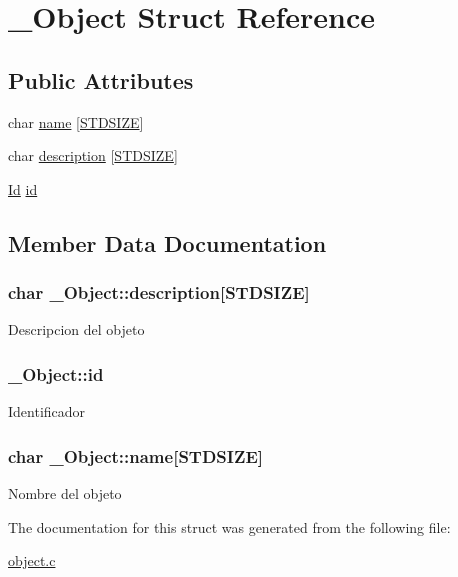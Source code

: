 \hypertarget{struct__Object}{\section{\+\_\+\+Object Struct Reference}
\label{struct__Object}
}
\subsection*{Public Attributes}
\begin{DoxyCompactItemize}
\item 
char \hyperlink{struct__Object_a5f13167436f75d12f48d3f152ce91d0a}{name} \mbox{[}\hyperlink{types_8h_a431b1676533a0e1714aff7d6a5542406}{S\+T\+D\+S\+I\+Z\+E}\mbox{]}
\item 
char \hyperlink{struct__Object_a4797c28bbea5a64792ec85433ee7215e}{description} \mbox{[}\hyperlink{types_8h_a431b1676533a0e1714aff7d6a5542406}{S\+T\+D\+S\+I\+Z\+E}\mbox{]}
\item 
\hyperlink{types_8h_a845e604fb28f7e3d97549da3448149d3}{Id} \hyperlink{struct__Object_a3cff7a0e8dc4e9d23895ed9af1b7653a}{id}
\end{DoxyCompactItemize}


\subsection{Member Data Documentation}
\hypertarget{struct__Object_a4797c28bbea5a64792ec85433ee7215e}{
\subsubsection[{description}]{\setlength{\rightskip}{0pt plus 5cm}char \+\_\+\+Object\+::description\mbox{[}{\bf S\+T\+D\+S\+I\+Z\+E}\mbox{]}}}\label{struct__Object_a4797c28bbea5a64792ec85433ee7215e}
Descripcion del objeto \hypertarget{struct__Object_a3cff7a0e8dc4e9d23895ed9af1b7653a}{
\subsubsection[{id}]{ \+\_\+\+Object\+::id}}\label{struct__Object_a3cff7a0e8dc4e9d23895ed9af1b7653a}
Identificador \hypertarget{struct__Object_a5f13167436f75d12f48d3f152ce91d0a}{
\subsubsection[{name}]{\setlength{\rightskip}{0pt plus 5cm}char \+\_\+\+Object\+::name\mbox{[}{\bf S\+T\+D\+S\+I\+Z\+E}\mbox{]}}}\label{struct__Object_a5f13167436f75d12f48d3f152ce91d0a}
Nombre del objeto 

The documentation for this struct was generated from the following file\+:\begin{DoxyCompactItemize}
\item 
\hyperlink{object_8c}{object.\+c}\end{DoxyCompactItemize}
